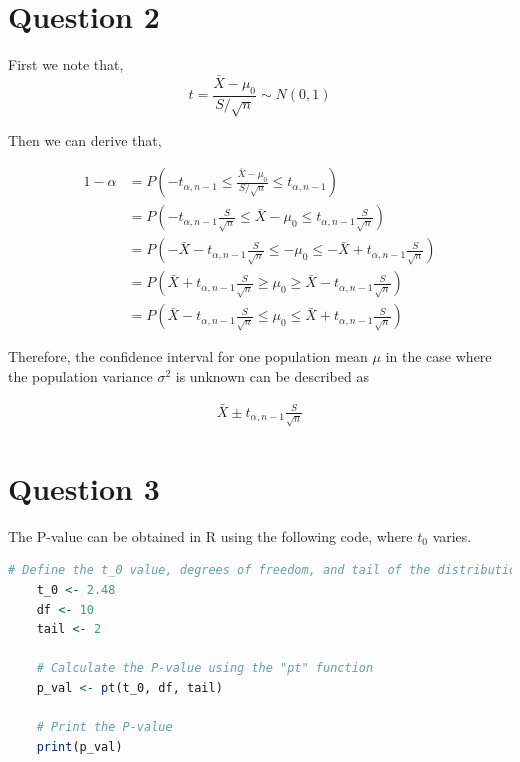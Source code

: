 \documentclass{article}
\begin{document}
\section*{Question 2}

First we note that,
\begin{equation*}
    t = \frac{\bar{X} - \mu_0}{S/\sqrt{n}} \sim N(0,1)
    \end{equation*}
\begin{flushleft}
Then we can derive that,
    \end{flushleft}
    
\begin{align*}
    1 - \alpha &= P(-t_{\alpha,n-1} \leq \frac{\bar{X} - \mu_0}{S/\sqrt{n}} \leq t_{\alpha,n-1}) \\
                &= P(-t_{\alpha,n-1} \frac{S}{\sqrt{n}} \leq \bar{X} - \mu_0 \leq t_{\alpha,n-1} \frac{S}{\sqrt{n}}) \\
                &= P(-\bar{X} - t_{\alpha,n-1} \frac{S}{\sqrt{n}} \leq -\mu_0 \leq -\bar{X} + t_{\alpha,n-1} \frac{S}{\sqrt{n}}) \\
                &= P(\bar{X} + t_{\alpha,n-1} \frac{S}{\sqrt{n}} \geq \mu_0 \geq \bar{X} - t_{\alpha,n-1} \frac{S}{\sqrt{n}}) \\
                &= P(\bar{X} - t_{\alpha,n-1} \frac{S}{\sqrt{n}} \leq \mu_0 \leq \bar{X} + t_{\alpha,n-1} \frac{S}{\sqrt{n}})
    \end{align*}

Therefore, the confidence interval for one population mean $\mu$ in the case
where the population variance $\sigma ^{2}$ is unknown can be described as

\begin{align*}
    \bar{X} \pm t_{\alpha,n-1}\frac{S}{\sqrt{n}}
\end{align*}

\section*{Question 3}
The P-value can be obtained in R using the following code, where $t_0$ varies.
\begin{lstlisting}[language=R, caption=Calculating the P-value for a $t_0$ value, basicstyle=\small]
    # Define the t_0 value, degrees of freedom, and tail of the distribution
    t_0 <- 2.48
    df <- 10
    tail <- 2
    
    # Calculate the P-value using the "pt" function
    p_val <- pt(t_0, df, tail)
    
    # Print the P-value
    print(p_val)
    \end{lstlisting}
\end{document}
